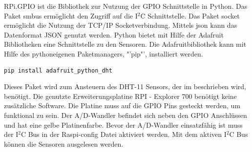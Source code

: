 RPi.GPIO ist die Bibliothek zur Nutzung der \ac{GPIO} Schnittstelle in Python. Das Paket smbus ermöglicht den Zugriff auf die I$^2$C Schnittstelle. Das Paket socket ermöglicht die Nutzung der TCP/IP Socketverbindung. Mittels json kann das Datenformat \ac{JSON} genutzt werden. Python bietet mit Hilfe der Adafruit\cite{Adafruit60:online} Bibliotheken eine Schnittstelle zu den Sensoren. Die Adafruitbibliothek kann mit Hilfe des pythoneigenen Paketmanagers, "'pip"', installiert werden.
\begin{lstlisting}[caption=Installation der Adafruit Bibliothek mit pip,frame=single]
pip install adafruit_python_dht
\end{lstlisting}
Dieses Paket wird zum Ansteuern des DHT-11 Sensors, der im  beschrieben wird, benötigt. Die genutzte Erweiterungsplatine RPI - Explorer 700 benötigt keine zusätzliche Software. Die Platine muss auf die \ac{GPIO} Pins gesteckt werden, um funktional zu sein. Der \ac{A/D-Wandler} befindet sich neben den \ac{GPIO} Anschlüssen und hat eine gelbe Platinenfarbe. Bevor der \ac{A/D-Wandler} einsatzfähig ist muss der I$^2$C Bus in der Raspi-config Datei aktiviert werden. Mit dem aktiven I$^2$C Bus können die Sensoren ausgelesen werden.
